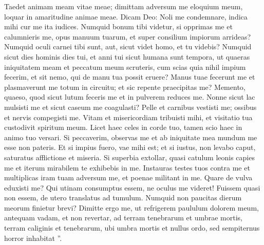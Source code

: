 \begin{biblechapter}
\begin{biblechapter}
\begin{biblechapter}
\begin{biblechapter}
\begin{biblechapter}
\begin{biblechapter}
\begin{biblechapter}
\begin{biblechapter}
\begin{biblechapter}
\begin{biblechapter}
\verse Taedet animam meam vitae meae;
 dimittam adversum me eloquium meum,
 loquar in amaritudine animae meae.
 \verse Dicam Deo: Noli me condemnare,
 indica mihi cur me ita iudices.
 \verse Numquid bonum tibi videtur, si opprimas me
 et calumnieris me, opus manuum tuarum,
 et super consilium impiorum arrideas?
 \verse Numquid oculi carnei tibi sunt,
 aut, sicut videt homo, et tu videbis? 
\verse Numquid sicut dies hominis dies tui,
 et anni tui sicut humana sunt tempora,
 \verse ut quaeras iniquitatem meam
 et peccatum meum scruteris,
 \verse cum scias quia nihil impium fecerim,
 et sit nemo, qui de manu tua possit eruere?
 \verse Manus tuae fecerunt me
 et plasmaverunt me totum in circuitu;
 et sic repente praecipitas me?
 \verse Memento, quaeso, quod sicut lutum feceris me
 et in pulverem reduces me.
 \verse Nonne sicut lac mulsisti me
 et sicut caseum me coagulasti?
 \verse Pelle et carnibus vestisti me;
 ossibus et nervis compegisti me.
 \verse Vitam et misericordiam tribuisti mihi,
 et visitatio tua custodivit spiritum meum.
 \verse Licet haec celes in corde tuo,
 tamen scio haec in animo tuo versari.
 \verse Si peccaverim, observas me
 et ab iniquitate mea mundum me esse non pateris.
 \verse Et si impius fuero, vae mihi est;
 et si iustus, non levabo caput,
 saturatus afflictione et miseria.
 \verse Si superbia extollar, quasi catulum leonis capies me
 et iterum mirabilem te exhibebis in me.
 \verse Instauras testes tuos contra me
 et multiplicas iram tuam adversum me,
 et poenae militant in me.
 \verse Quare de vulva eduxisti me?
 Qui utinam consumptus essem, ne oculus me videret!
 \verse Fuissem quasi non essem,
 de utero translatus ad tumulum.
 \verse Numquid non paucitas dierum meorum finietur brevi?
 Dimitte ergo me, ut refrigerem paululum dolorem meum,
 \verse antequam vadam, et non revertar,
 ad terram tenebrarum et umbrae mortis,
 \verse terram caliginis et tenebrarum,
 ubi umbra mortis et nullus ordo,
 sed sempiternus horror inhabitat ”.
 

\end{biblechapter}
\end{biblechapter}
\end{biblechapter}
\end{biblechapter}
\end{biblechapter}
\end{biblechapter}
\end{biblechapter}
\end{biblechapter}
\end{biblechapter}
\end{biblechapter}
